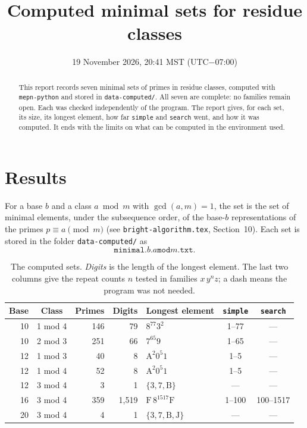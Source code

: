 \documentclass[11pt]{article}
\title{Computed minimal sets for residue classes}
\author{}  %
\date{19 November 2026, 20:41 MST (UTC$-$07:00)}
\newcommand{\code}[1]{\texttt{#1}}
\begin{document}
\maketitle

\begin{abstract}
This report records seven minimal sets of primes in residue classes, computed with \code{mepn-python} and stored in \code{data-computed/}. All seven are complete: no families remain open. Each was checked independently of the program. The report gives, for each set, its size, its longest element, how far \code{simple} and \code{search} went, and how it was computed. It ends with the limits on what can be computed in the environment used.
\end{abstract}

\section{Results}

For a base $b$ and a class $a \bmod m$ with $\gcd(a,m)=1$, the set is the set of minimal elements, under the subsequence order, of the base-$b$ representations of the primes $p\equiv a \pmod m$ (see \code{bright-algorithm.tex}, Section~10). Each set is stored in the folder \code{data-computed/} as
\[
  \code{minimal.}b\code{.}a\code{mod}m\code{.txt}.
\]

\begin{table}[h]
\centering
\begin{tabular}{@{}rcrrlcc@{}}
\toprule
Base & Class & Primes & Digits & Longest element & \code{simple} & \code{search}\\
\midrule
10 & 1 mod 4 & 146 & 79    & $8^{77}3^2$          & 1--77  & --- \\
10 & 2 mod 3 & 251 & 66    & $7^{65}9$            & 1--65  & --- \\
12 & 1 mod 3 & 40  & 8     & $\mathrm{A}^2 0^5 1$ & 1--5   & --- \\
12 & 1 mod 4 & 52  & 8     & $\mathrm{A}^2 0^5 1$ & 1--5   & --- \\
12 & 3 mod 4 & 3   & 1     & $\{3,7,\mathrm{B}\}$  & ---    & --- \\
16 & 3 mod 4 & 359 & 1{,}519 & $\mathrm{F}\,8^{1517}\mathrm{F}$ & 1--100 & 100--1517 \\
20 & 3 mod 4 & 4   & 1     & $\{3,7,\mathrm{B},\mathrm{J}\}$ & --- & --- \\
\bottomrule
\end{tabular}
\caption{The computed sets. \emph{Digits} is the length of the longest element. The last two columns give the repeat counts $n$ tested in families $x\,y^n z$; a dash means the program was not needed.}
\end{table}
\end{document}
